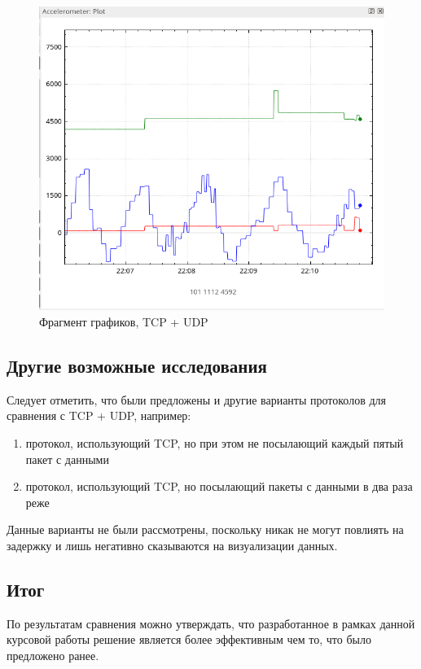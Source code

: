 \documentclass[14pt]{matmex-diploma-custom.cls}
\begin{document}
\begin{figure}
\centering
\includegraphics[width=\textwidth]{tcpudp.png}
\caption{Фрагмент графиков, TCP + UDP \label{overflow5}}
\end{figure}

\subsection{Другие возможные исследования}
Следует отметить, что были предложены и другие варианты протоколов для сравнения с TCP + UDP, например:
\begin{enumerate}
\item протокол, использующий TCP, но при этом не посылающий каждый пятый пакет с данными
\item протокол, использующий TCP, но посылающий пакеты с данными в два раза реже
\end{enumerate}

Данные варианты не были рассмотрены, поскольку никак не могут повлиять на задержку и лишь негативно сказываются на визуализации данных.

\subsection{Итог}
По результатам сравнения можно утверждать, что разработанное в рамках данной курсовой работы решение является более эффективным чем то, что было предложено ранее.
\end{document}
